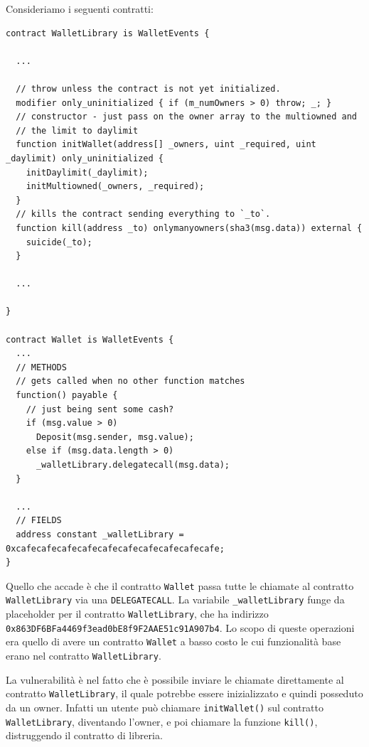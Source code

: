 Consideriamo i seguenti contratti:
\begin{lstlisting}[language=Solidity]
contract WalletLibrary is WalletEvents {
  
  ...
  
  // throw unless the contract is not yet initialized.
  modifier only_uninitialized { if (m_numOwners > 0) throw; _; }
  // constructor - just pass on the owner array to the multiowned and
  // the limit to daylimit
  function initWallet(address[] _owners, uint _required, uint _daylimit) only_uninitialized {
    initDaylimit(_daylimit);
    initMultiowned(_owners, _required);
  }
  // kills the contract sending everything to `_to`.
  function kill(address _to) onlymanyowners(sha3(msg.data)) external {
    suicide(_to);
  }
  
  ...
  
}

contract Wallet is WalletEvents {
  ...
  // METHODS
  // gets called when no other function matches
  function() payable {
    // just being sent some cash?
    if (msg.value > 0)
      Deposit(msg.sender, msg.value);
    else if (msg.data.length > 0)
      _walletLibrary.delegatecall(msg.data);
  }
  
  ...  
  // FIELDS
  address constant _walletLibrary = 0xcafecafecafecafecafecafecafecafecafecafe;
}
\end{lstlisting}
Quello che accade è che il contratto \texttt{Wallet} passa tutte le chiamate al contratto \texttt{WalletLibrary} via una \texttt{DELEGATECALL}. La variabile \texttt{\_walletLibrary} funge da placeholder per il contratto \texttt{WalletLibrary}, che ha indirizzo \texttt{0x863DF6BFa4469f3ead0bE8f9F2AAE51c91A907b4}. Lo scopo di queste operazioni era quello di avere un contratto \texttt{Wallet} a basso costo le cui funzionalità base erano nel contratto \texttt{WalletLibrary}. 

La vulnerabilità è nel fatto che è possibile inviare le chiamate direttamente al contratto \texttt{WalletLibrary}, il quale potrebbe essere inizializzato e quindi posseduto da un owner. Infatti un utente può chiamare \texttt{initWallet()} sul contratto \texttt{WalletLibrary}, diventando l'owner, e poi chiamare la funzione \texttt{kill()}, distruggendo il contratto di libreria.

\vspace{5mm}

